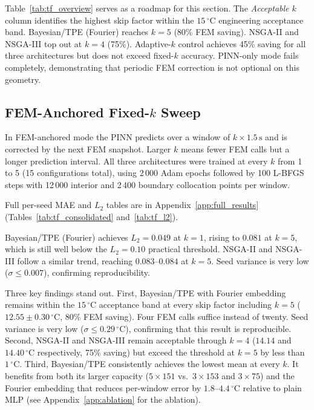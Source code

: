 Table~\ref{tab:tf_overview} serves as a roadmap for this section. The
\emph{Acceptable $k$} column identifies the highest skip factor within the
$15\,^\circ\mathrm{C}$ engineering acceptance band. Bayesian/TPE (Fourier)
reaches $k=5$ (80\% FEM saving). NSGA-II and NSGA-III top out at $k=4$
(75\%). Adaptive-$k$ control achieves 45\% saving for all three architectures
but does not exceed fixed-$k$ accuracy. PINN-only mode fails completely,
demonstrating that periodic FEM correction is not optional on this geometry.

\subsection{FEM-Anchored Fixed-$k$ Sweep}
\label{subsec:tf_fem_fixed}

In FEM-anchored mode the PINN predicts over a window of $k \times 1.5\,\mathrm{s}$
and is corrected by the next FEM snapshot.  Larger $k$ means fewer FEM calls
but a longer prediction interval.  All three architectures were trained at
every $k$ from 1 to 5 (15 configurations total), using 2\,000 Adam epochs
followed by 100 L-BFGS steps with 12\,000 interior and 2\,400 boundary
collocation points per window.

Full per-seed MAE and $L_2$ tables are in Appendix~\ref{app:full_results}
(Tables~\ref{tab:tf_consolidated} and~\ref{tab:tf_l2}).

Bayesian/TPE (Fourier) achieves $L_2{=}0.049$ at $k=1$, rising to $0.081$
at $k=5$, which is still well below the $L_2{=}0.10$ practical threshold.
NSGA-II and NSGA-III follow a similar trend, reaching $0.083$--$0.084$ at
$k=5$.
Seed variance is very low ($\sigma \leq 0.007$), confirming reproducibility.

Three key findings stand out. First, Bayesian/TPE with Fourier embedding remains within
the $15\,^\circ\mathrm{C}$ acceptance band at every skip factor including
$k=5$ ($12.55\pm0.30\,^\circ\mathrm{C}$, 80\% FEM saving). Four FEM calls
suffice instead of twenty. Seed variance is very low
($\sigma \leq 0.29\,^\circ\mathrm{C}$), confirming that this result is
reproducible. Second, NSGA-II and NSGA-III remain acceptable through $k=4$
($14.14$ and $14.40\,^\circ\mathrm{C}$ respectively, 75\% saving) but exceed
the threshold at $k=5$ by less than $1\,^\circ\mathrm{C}$. Third, Bayesian/TPE
consistently achieves the lowest mean at every $k$. It benefits from both its
larger capacity ($5{\times}151$ vs.\ $3{\times}153$ and $3{\times}75$) and the
Fourier embedding that reduces per-window error by $1.8$--$4.4\,^\circ\mathrm{C}$
relative to plain MLP (see Appendix~\ref{app:ablation} for the ablation).

